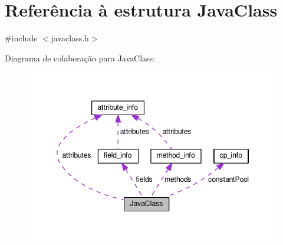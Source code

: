 \hypertarget{structJavaClass}{}\section{Referência à estrutura Java\+Class}
\label{structJavaClass}


{\ttfamily \#include $<$javaclass.\+h$>$}



Diagrama de colaboração para Java\+Class\+:\nopagebreak
\begin{figure}[H]
\begin{center}
\leavevmode
\includegraphics[width=349pt]{structJavaClass__coll__graph}
\end{center}
\end{figure}
